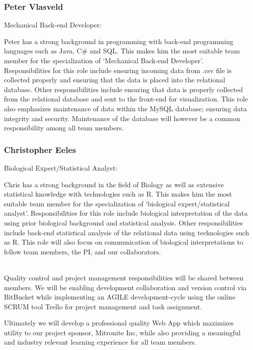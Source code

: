 \documentclass[10pt,twocolumn,letterpaper]{article}
\begin{document}
                \subsubsection*{Peter Vlasveld}

                Mechanical Back-end Developer:

		Peter has a strong background in programming with back-end programming languages such as Java, C# and SQL.
		This makes him the most suitable team member for the specialization of `Mechanical Back-end Developer'.
		Responsibilities for this role include ensuring incoming data from .csv file is collected properly and ensuring that the data is placed into
		the relational database.
		Other responsibilities include ensuring that data is properly collected from the relational database and sent to the front-end for visualization.
		This role also emphasizes maintenance of data within the MySQL database; ensuring data integrity and security.
		Maintenance of the database will however be a common responsibility among all team members.

                \subsubsection*{Christopher Eeles}

                Biological Expert/Statistical Analyst:
		
		Chris has a strong background in the field of Biology as well as extensive statistical knowledge with technologies such as R.
		This makes him the most suitable team member for the specialization of `biological expert/statistical analyst'.
		Responsibilities for this role include biological interpretation of the data using prior biological background and statistical analysis.
		Other responsibilities include back-end statistical analysis of the relational data using technologies such as R.
		This role will also focus on communication of biological interpretations to fellow team members, the PI, and our collaborators.
		
		\\

            	Quality control and project management responsibilities will be shared between members.
		We will be enabling development collaboration and version control via BitBucket while implementing an
		AGILE development-cycle using the online SCRUM tool Trello for project management and task assignment.

            	Ultimately we will develop a professional quality Web App which maximizes utility to our project sponsor,
		Mitronite Inc, while also providing a meaningful and industry relevant learning experience for all team members.
\end{document}
